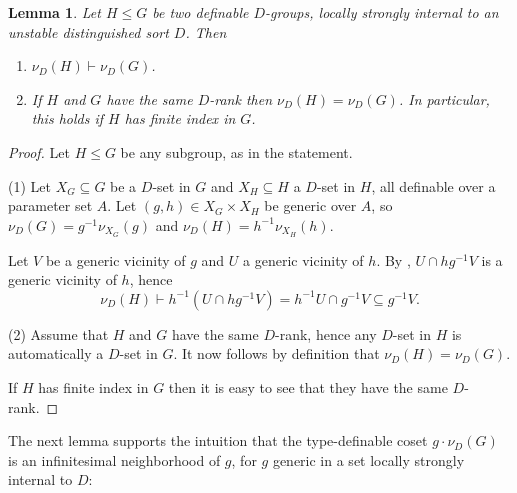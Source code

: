 \documentclass[11pt]{amsart}
\newtheorem{lemma}[theorem]{Lemma}
\theoremstyle{definition}
\newcommand{\0}{\emptyset}
\def\sub{\subseteq}
\begin{document}
\begin{lemma}\label{L:nu of subgroup} 
Let $H\leq G$ be two definable $D$-groups, locally strongly internal to an unstable distinguished sort $D$. Then 

\begin{enumerate}
    \item $\nu_D(H)\vdash \nu_D(G)$.
    \item If $H$ and $G$ have the same $D$-rank then $\nu_D(H)=\nu_D(G)$. In particular, this holds if $H$ has finite index in $G$.
\end{enumerate}
\end{lemma} 
\begin{proof} 
Let $H\leq G$ be any subgroup, as in the statement.

(1) Let $X_G\subseteq G$ be a $D$-set in $G$  and $X_H\subseteq H$ a $D$-set in $H$,  all definable over a parameter set $A$. Let $(g,h)\in X_G\times X_H$ be  generic over $A$, so $\nu_D(G)=g^{-1}\nu_{X_G}(g)$ and $\nu_D(H)=h^{-1}\nu_{X_H}(h)$.

Let $V$ be a generic vicinity of $g$ and $U$ a generic vicinity of $h$.  By \cite[Lemma 4.26]{HaHaPeGps}, $U\cap hg^{-1} V$ is a generic vicinity of $h$, hence
\[\nu_D(H)\vdash h^{-1}(U\cap hg^{-1}V)=h^{-1}U\cap g^{-1}V\sub g^{-1}V.\]

(2) Assume that $H$ and $G$ have the same $D$-rank, hence any $D$-set in $H$ is automatically a $D$-set in $G$. It now follows by definition that $\nu_D(H)=\nu_D(G)$.

If $H$ has finite index in $G$ then it is easy to see that they have the same $D$-rank. 
\end{proof} 

The next lemma supports the intuition that the type-definable coset $g\cdot \nu_D(G)$ is an infinitesimal neighborhood of $g$, for $g$ generic in a set locally strongly internal to $D$: 
\end{document}

